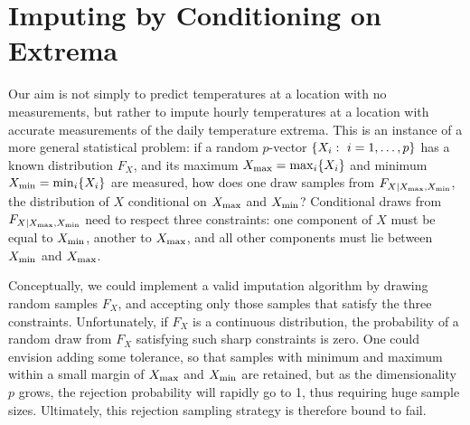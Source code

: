 \documentclass[12pt]{article}
\begin{document}
\section{Imputing by Conditioning on Extrema}
\label{imputations}
    
Our aim is not simply to predict temperatures at a location with no measurements, but rather to impute hourly temperatures at a location with accurate measurements of the daily temperature extrema.
This is an instance of a more general statistical problem: if a random \(p\)-vector \(\left\lbrace X_i:~i=1,\dotsc,p\right\rbrace\) has a known distribution \(F_X\), and its maximum \(\Xmax = \max_i\cbr{X_i}\) and minimum \(\Xmin = \min_i\cbr{X_i}\) are measured, how does one draw samples from \(F_{X \mid X_{\max},X_{\min}}\), the distribution of \(X\) conditional on \(X_{\max}\) and \(X_{\min}\)?
Conditional draws from \(F_{X \mid X_{\max},X_{\min}}\) need to respect three constraints: one component of \(X\) must be equal to \(X_{\min}\), another to \(X_{\max}\), and all other components must lie between \(X_{\min}\) and \(X_{\max}\).

Conceptually, we could implement a valid imputation algorithm by drawing random samples \(F_X\),
and accepting only those samples that satisfy the three constraints.
Unfortunately, if \(F_X\) is a continuous distribution, the probability of a random draw from \(F_X\) satisfying such sharp constraints is zero.
One could envision adding some tolerance, so that samples with minimum and maximum within a small margin of \(X_{\max}\) and \(X_{\min}\) are retained, but as the dimensionality \(p\) grows, the rejection probability will rapidly go to 1, thus requiring huge sample sizes.
Ultimately, this rejection sampling strategy is therefore bound to fail.
\end{document}
